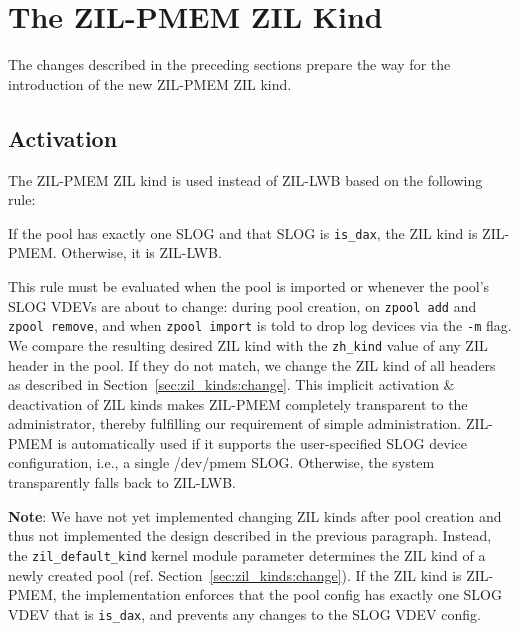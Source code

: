 \documentclass[12pt,a4paper,twoside]{book}
\begin{document}
{\section{The ZIL-PMEM ZIL Kind}\label{sec:zilpmemzilkind}
The changes described in the preceding sections prepare the way for the introduction of the new ZIL-PMEM ZIL kind.

\subsection{Activation}\label{sec:zilpmemzilkind:activation}
The ZIL-PMEM ZIL kind is used instead of ZIL-LWB based on the following rule:
\begin{displayquote}
  If the pool has exactly one SLOG and that SLOG is \lstinline{is_dax}, the ZIL kind is ZIL-PMEM. Otherwise, it is ZIL-LWB.
\end{displayquote}
This rule must be evaluated when the pool is imported or whenever the pool's SLOG VDEVs are about to change:
during pool creation, on \lstinline{zpool add} and \lstinline{zpool remove}, and when \lstinline{zpool import} is told to drop log devices via the \lstinline{-m} flag.
We compare the resulting desired ZIL kind with the \lstinline{zh_kind} value of any ZIL header in the pool.
If they do not match, we change the ZIL kind of all headers as described in Section~\ref{sec:zil_kinds:change}.
This implicit activation \& deactivation of ZIL kinds makes ZIL-PMEM completely transparent to the administrator, thereby fulfilling our requirement of simple administration.
ZIL-PMEM is automatically used if it supports the user-specified SLOG device configuration, i.e., a single /dev/pmem SLOG.
Otherwise, the system transparently falls back to ZIL-LWB.

\textbf{Note}: We have not yet implemented changing ZIL kinds after pool creation and thus not implemented the design described in the previous paragraph.
Instead, the \lstinline{zil_default_kind} kernel module parameter determines the ZIL kind of a newly created pool (ref. Section~\ref{sec:zil_kinds:change}).
If the ZIL kind is ZIL-PMEM, the implementation enforces that the pool config has exactly one SLOG VDEV that is \lstinline{is_dax}, and prevents any changes to the SLOG VDEV config.

}
\end{document}
